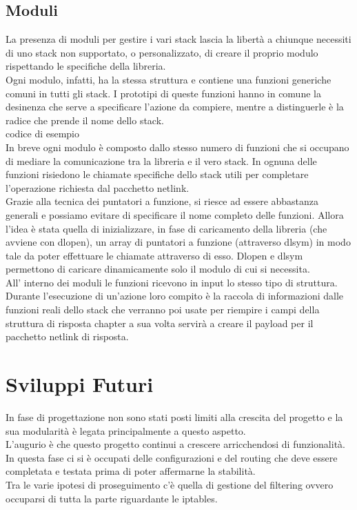 \subsection{Moduli}
La presenza di moduli per gestire i vari stack lascia la libert\`a a chiunque necessiti di uno stack non supportato, o personalizzato, di creare il proprio modulo rispettando le specifiche della libreria.\\
Ogni modulo, infatti, ha la stessa struttura e contiene una funzioni generiche comuni in tutti gli stack. I prototipi di queste funzioni hanno in comune la desinenza che serve a specificare l'azione da compiere, mentre a distinguerle \`e la radice che prende il nome dello stack.
\\ codice di esempio \\
In breve ogni modulo \`e composto dallo stesso numero di funzioni che si occupano di mediare la comunicazione tra la libreria e il vero stack.
In ognuna delle funzioni risiedono le chiamate specifiche dello stack utili per completare l'operazione richiesta dal pacchetto netlink.\\
Grazie alla tecnica dei puntatori a funzione, si riesce ad essere abbastanza generali e possiamo evitare di specificare il nome completo delle funzioni. Allora l'idea \`e stata quella di inizializzare, in fase di caricamento della libreria (che avviene con dlopen), un array di puntatori a funzione (attraverso dlsym) in modo tale da poter effettuare le chiamate attraverso di esso. Dlopen e dlsym permettono di caricare dinamicamente solo il modulo di cui si necessita.\\
All' interno dei moduli le funzioni ricevono in input lo stesso tipo di struttura. Durante l'esecuzione di un'azione loro compito \`e la raccola di informazioni dalle funzioni reali dello stack che verranno poi usate per riempire i campi della struttura di risposta chapter a sua volta servir\`a a creare il payload per il pacchetto netlink di risposta.
\section{Sviluppi Futuri}
In fase di progettazione non sono stati posti limiti alla crescita del progetto e la sua modularit\`a \`e legata principalmente a questo aspetto.\\
L'augurio \`e che questo progetto continui a crescere arricchendosi di funzionalit\`a.\\
In questa fase ci si \`e occupati delle configurazioni e del routing che deve essere completata e testata prima di poter affermarne la stabilit\`a.\\
Tra le varie ipotesi di proseguimento c'\`e quella di gestione del filtering ovvero occuparsi di tutta la parte riguardante le iptables.
\clearpage{\pagestyle{empty}\cleardoublepage}
